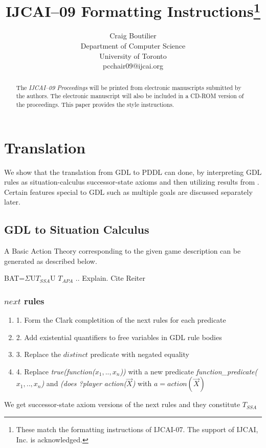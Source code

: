 \documentclass{article}
\title{IJCAI--09 Formatting Instructions\thanks{These match the formatting instructions of IJCAI-07. The support of IJCAI, Inc. is acknowledged.}}
\author{Craig Boutilier \\
Department of Computer Science\\
University of Toronto \\
pcchair09@ijcai.org}
\begin{document}
\maketitle

\begin{abstract}
  The {\it IJCAI--09 Proceedings} will be printed from electronic
  manuscripts submitted by the authors. The electronic manuscript will
  also be included in a CD-ROM version of the proceedings. This paper
  provides the style instructions.
\end{abstract}

\section{Translation}

We show that the translation from GDL to PDDL can done, by interpreting GDL rules as situation-calculus successor-state axioms and then utilizing results from \cite{roeger:kr}.
Certain features special to GDL such as multiple goals are discussed separately later.

\subsection{GDL to Situation Calculus}

A Basic Action Theory corresponding to the given game description
can be generated as described below.

BAT=$\Sigma$U$T_{SSA}$U $T_{APA}$ .. Explain. Cite Reiter 

\subsubsection{$next$ rules}

\begin{enumerate}
\item 1. Form the Clark completition of the next rules for each predicate
\item 2. Add existential quantifiers to free variables in GDL rule bodies
\item 3. Replace the $distinct$ predicate with negated equality
\item 4. Replace \emph{ true(function($x_{1},..,x_{n}$)) }with a new predicate \emph{function\_predicate($x_{1},..,x_{n}$)
} and \emph{(does ?player action($\vec{X}$)} with \emph{$a=action(\vec{X})$}
\end{enumerate}

We get successor-state axiom versions of the next rules and they constitute $T_{SSA}$
\end{document}
